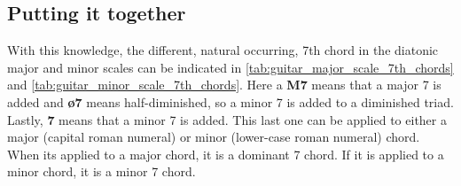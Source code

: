 \newpage 

\subsection{Putting it together}

With this knowledge, the different, natural occurring, 7th chord in the diatonic major and minor scales can be indicated in \autoref{tab:guitar_major_scale_7th_chords} and \autoref{tab:guitar_minor_scale_7th_chords}. Here a \textbf{M7} means that a major 7 is added and \textbf{\o7} means half-diminished, so a minor 7 is added to a diminished triad. Lastly, \textbf{7} means that a minor 7 is added. This last one can be applied to either a major (capital roman numeral) or minor (lower-case roman numeral) chord. When its applied to a major chord, it is a dominant 7 chord. If it is applied to a minor chord, it is a minor 7 chord.

